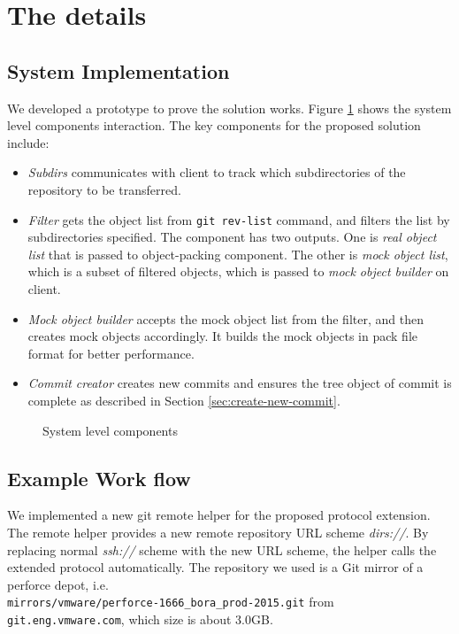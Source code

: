 \documentclass[copyrightwanted=false]{sigplanconf}
\begin{document}
\section{The details}
\subsection{System Implementation}
We developed a prototype to prove the solution works.
Figure \ref{fig:components} shows the system level components interaction.
The key components for the proposed solution include:
\begin{itemize}
  \item \emph{Subdirs} communicates with client to track which subdirectories
    of the repository to be transferred.

  \item \emph{Filter} gets the object list from
    \verb|git rev-list| command, and filters the list by subdirectories specified.
    The component has two outputs.
    One is \emph{real object list} that is passed to object-packing component.
    The other is \emph{mock object list}, which is a subset of filtered
    objects, which is passed to \emph{mock object builder} on client.

  \item \emph{Mock object builder} accepts the mock object list
    from the filter, and then creates mock objects accordingly.
    It builds the mock objects in pack file format\cite{packformat} for better
    performance.

  \item \emph{Commit creator} creates new commits and ensures
    the tree object of commit is complete as described in Section
    \ref{sec:create-new-commit}.
\end{itemize}
\begin{figure}[htpb]
  \centering
  
  \caption{System level components}
  \label{fig:components}
\end{figure}

\subsection{Example Work flow}
We implemented a new git remote helper\cite{git-remote-helper} for the proposed
protocol extension.
The remote helper provides a new remote repository URL scheme \emph{dirs://}.
By replacing normal \emph{ssh://} scheme with the new URL scheme, the helper calls the
extended protocol automatically.
The repository we used is a Git mirror of a perforce depot, i.e.\\
\verb|mirrors/vmware/perforce-1666_bora_prod-2015.git| from
\verb|git.eng.vmware.com|, which size is about 3.0GB.
\end{document}
